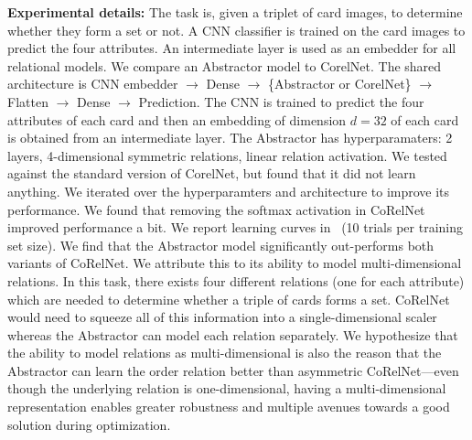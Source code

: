 \textbf{Experimental details:} The task is, given a triplet of card images, to determine whether they form a set or not. A CNN classifier is trained on the card images to predict the four attributes. An intermediate layer is used as an embedder for all relational models. We compare an Abstractor model to CorelNet. The shared architecture is CNN embedder $\to$ Dense $\to$ \{Abstractor or CorelNet\} $\to$ Flatten $\to$ Dense $\to$ Prediction. The CNN is trained to predict the four attributes of
each card and then an embedding of dimension $d=32$ of each card is obtained from an intermediate layer. The Abstractor has hyperparamaters: 2 layers, 4-dimensional symmetric relations, linear relation activation. We tested against the standard version of CorelNet, but found that it did not learn anything. We iterated over the hyperparamters and architecture to improve its performance. We found that removing the softmax activation in CoRelNet improved performance a bit. We report learning curves in~ (10 trials per training set size). We find that the Abstractor model significantly out-performs both variants of CoRelNet. We attribute this to its ability to model multi-dimensional relations. In this task, there exists four different relations (one for each attribute) which are needed to determine whether a triple of cards forms a set. CoRelNet would need to squeeze all of this information into a single-dimensional scaler whereas the Abstractor can model each relation separately. We hypothesize that the ability to model relations as multi-dimensional is also the reason that the Abstractor can learn the order relation better than asymmetric CoRelNet---even though the underlying relation is one-dimensional, having a multi-dimensional representation enables greater robustness and multiple avenues towards a good solution during optimization.


